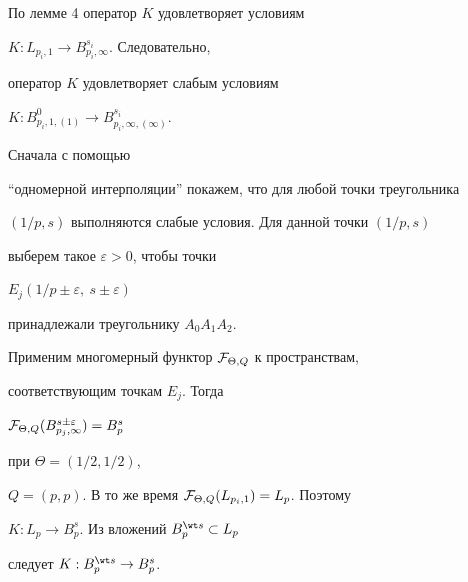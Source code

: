 \begin{pf}


По лемме 4 оператор $K$ удовлетворяет условиям


$K:L_{p_i,1}\rightarrow B^{s_i}_{p_i,\infty }$. Следовательно,


оператор $K$ удовлетворяет слабым условиям


$K: B^0_{p_i,1,(1)}\rightarrow B^{s_i}_{p_i,\infty,(\infty )}$.


Сначала с помощью


``одномерной интерполяции'' покажем, что для любой точки треугольника


$(1/p,s)$ выполняются слабые условия. Для данной точки $(1/p,s)$


выберем такое $\varepsilon >0$, чтобы точки


$E_j(1/p \pm \varepsilon,\ s \pm \varepsilon)$


принадлежали треугольнику $A_0A_1A_2$.


Применим многомерный функтор ${\cal F}_{\Theta,Q}$ к пространствам,


соответствующим точкам $E_j$. Тогда


${\cal F}_{\Theta,Q} (B^{s\pm\varepsilon}_{p_j,\infty})=B^s_p$


при $\Theta = (1/2,1/2)$,


$Q=(p,p)$. В то же время ${\cal F}_{\Theta,Q} (L_{p_i,1})=L_p$. Поэтому


$K:L_p \rightarrow B^s_p$. Из вложений $B^{\wt s}_p \subset L_p$


следует $K:B^{\wt s }_p \rightarrow B^s_p$.


\end{pf}





